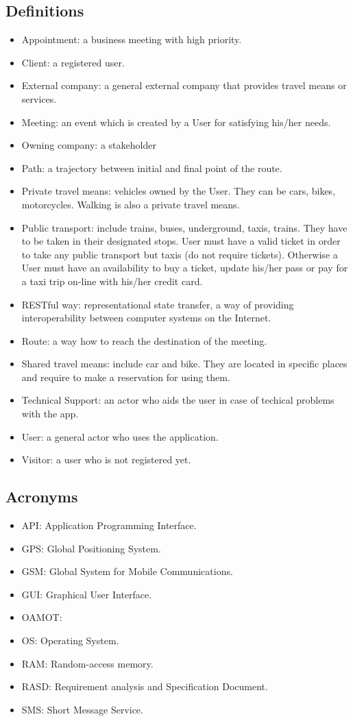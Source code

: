 \documentclass[a4paper,leqno]{book}
\begin{document}
\subsection{Definitions}
\begin{itemize}
	\item Appointment: a business meeting with high priority.
	\item Client: a registered user.
	\item External company: a general external company that provides travel means or services.
	\item Meeting: an event which is created by a User for satisfying his/her needs.
	\item Owning company: a stakeholder
	\item Path: a trajectory between initial and final point of the route.
	\item Private travel means: vehicles owned by the User. They can be cars, bikes, motorcycles. Walking is also a private travel means.
	\item Public transport: include trains, buses, underground, taxis, trains. They have to be taken in their designated stops. User must have a valid ticket in order to take any public transport but taxis (do not require tickets). Otherwise a User must have an availability to buy a ticket, update his/her pass or pay for a taxi trip on-line with his/her credit card.
	\item RESTful way:  representational state transfer, a way of providing interoperability between computer systems on the Internet.
	\item Route: a way how to reach the destination of the meeting.
	\item Shared travel means: include car and bike. They are located in specific places and require to make a reservation for using them.
	\item Technical Support: an actor who aids the user in case of techical problems with the app.
	\item User: a general actor who uses the application.
	\item Visitor: a user who is not registered yet.
\end{itemize}

\subsection{Acronyms}
\begin{itemize}
	\item API: Application Programming Interface.
	\item GPS: Global Positioning System.
	\item GSM: Global System for Mobile Communications.
	\item GUI: Graphical User Interface.
	\item OAMOT:
	\item OS: Operating System.
	\item RAM: Random-access memory.
	\item RASD: Requirement analysis and Specification Document.
	\item SMS: Short Message Service.
\end{itemize}
\end{document}
